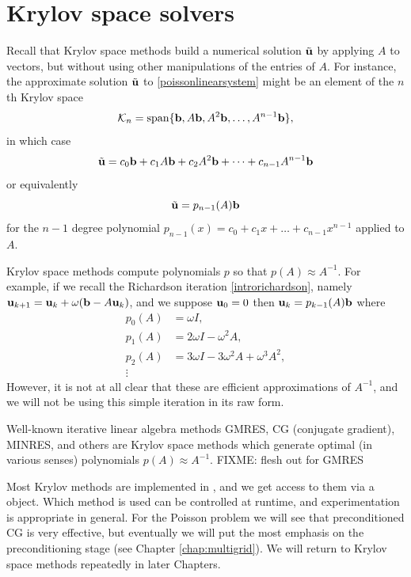 

\section{Krylov space solvers}

Recall that Krylov space methods \citep{TrefethenBau} build a numerical solution $\tilde{\mathbf{u}}$ by applying $A$ to vectors, but without using other manipulations of the entries of $A$.  For instance, the approximate solution $\tilde{\mathbf{u}}$ to \eqref{poissonlinearsystem} might be an element of the $n$th Krylov space
    $$\mathcal{K}_n = \operatorname{span}\{\mathbf{b},A\mathbf{b},A^2\mathbf{b},\dots,A^{n-1}\mathbf{b}\},$$
in which case
    $$\tilde{\mathbf{u}} = c_0 \mathbf{b} + c_1 A \mathbf{b} + c_2 A^2 \mathbf{b} + \dots + c_{n-1} A^{n-1} \mathbf{b}$$
or equivalently
    $$\tilde{\mathbf{u}} = p_{n-1}(A) \mathbf{b}$$
for the $n-1$ degree polynomial $p_{n-1}(x) = c_0 + c_1 x + \dots + c_{n-1} x^{n-1}$ applied to $A$.

Krylov space methods compute polynomials $p$ so that $p(A) \approx A^{-1}$.  For example, if we recall the Richardson iteration \eqref{introrichardson}, namely $\mathbf{u}_{k+1} = \mathbf{u}_k + \omega (\mathbf{b} - A \mathbf{u}_k)$, and we suppose $\mathbf{u}_0=0$ then $\mathbf{u}_k = p_{k-1}(A) \mathbf{b}$ where
\begin{align*}
p_0(A) &= \omega I, \\
p_1(A) &= 2 \omega I - \omega^2 A, \\
p_2(A) &= 3 \omega I - 3 \omega^2 A + \omega^3 A^2, \\
\vdots
\end{align*}
However, it is not at all clear that these are efficient approximations of $A^{-1}$, and we will not be using this simple iteration in its raw form.

Well-known iterative linear algebra methods GMRES, CG (conjugate gradient), MINRES, and others \citep{Greenbaum1997,Saad2003} are Krylov space methods which generate optimal (in various senses) polynomials $p(A) \approx A^{-1}$. FIXME: flesh out for GMRES

Most Krylov methods are implemented in \PETSc, and we get access to them via a \pKSP object.  Which method is used can be controlled at runtime, and experimentation is appropriate in general.  For the Poisson problem we will see that preconditioned CG is very effective, but eventually we will put the most emphasis on the preconditioning stage (see Chapter \ref{chap:multigrid}).  We will return to Krylov space methods repeatedly in later Chapters.


